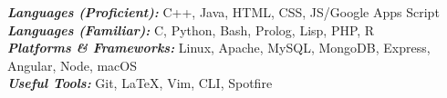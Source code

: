 

\begin{cvparagraph}
  \textbf{\textit{Languages (Proficient): }} C++, Java, HTML, CSS, JS/Google Apps Script\\
  \textbf{\textit{Languages (Familiar): }}C, Python, Bash, Prolog, Lisp, PHP, R \\
  \textbf{\textit{Platforms \& Frameworks: }}Linux, Apache, MySQL, MongoDB, Express, Angular, Node, macOS \\
  \textbf{\textit{Useful Tools: }}Git, \LaTeX, Vim, CLI, Spotfire
\end{cvparagraph}
